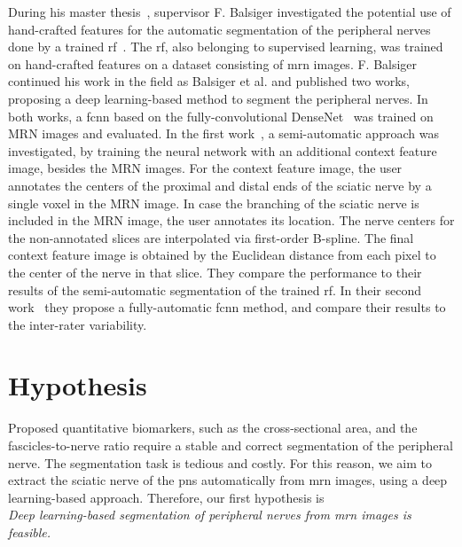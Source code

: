 During his master thesis~\cite{Balsiger2016DevelopmentApproaches}, supervisor F. Balsiger investigated the potential use of hand-crafted features for the automatic segmentation of the peripheral nerves done by a trained \gls{rf}~\cite{Breiman2001RandomForests}. The \gls{rf}, also belonging to supervised learning, was trained on hand-crafted features on a dataset consisting of \gls{mrn} images. F. Balsiger continued his work in the field as Balsiger et al. and published two works, proposing a deep learning-based method to segment the peripheral nerves. In both works, a \gls{fcnn} based on the fully-convolutional DenseNet~\cite{Huang2017DenselyNetworks} was trained on MRN images and evaluated. In the first work~\cite{BalsigerContext-awareNeurography}, a semi-automatic approach was investigated, by training the neural network with an additional context feature image, besides the MRN images. For the context feature image, the user annotates the centers of the proximal and distal ends of the sciatic nerve by a single voxel in the MRN image. In case the branching of the sciatic nerve is included in the MRN image, the user annotates its location. The nerve centers for the non-annotated slices are interpolated via first-order B-spline. The final context feature image is obtained by the Euclidean distance from each pixel to the center of the nerve in that slice. They compare the performance to their results of the semi-automatic segmentation of the trained \gls{rf}.
In their second work~\cite{Balsiger2018SegmentationApproach} they propose a fully-automatic \gls{fcnn} method, and compare their results to the inter-rater variability.

\section{Hypothesis} %
Proposed quantitative biomarkers, such as the cross-sectional area, and the fascicles-to-nerve ratio require a stable and correct segmentation of the peripheral nerve. The segmentation task is tedious and costly.
For this reason, we aim to extract the sciatic nerve of the \gls{pns} automatically from \acrshort{mrn} images, using a deep learning-based approach. Therefore, our first hypothesis is\\

\textit{Deep learning-based segmentation of peripheral nerves from \gls{mrn} images is feasible.} \\

